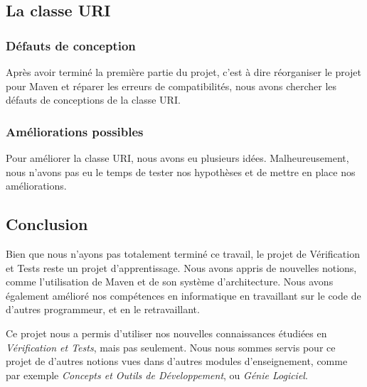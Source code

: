 \documentclass[a4paper]{article}
\begin{document}
	\vspace{0.5cm}

		\subsection{La classe URI}

		\vspace{0.5cm}

			\subsubsection{Défauts de conception}

			Après avoir terminé la première partie du projet, c'est à dire réorganiser le projet pour Maven et réparer les erreurs de compatibilités, nous avons chercher les défauts de conceptions de la classe URI.  

			\vspace{0.5cm}

			\subsubsection{Améliorations possibles}

			Pour améliorer la classe URI, nous avons eu plusieurs idées. Malheureusement, nous n'avons pas eu le temps de tester nos hypothèses et de mettre en place nos améliorations.

			\newpage

	\begin{center}
		\section{Conclusion}
	\end{center}	
		Bien que nous n'ayons pas totalement terminé ce travail, le projet de Vérification et Tests reste un projet d'apprentissage. Nous avons appris de nouvelles notions, comme l'utilisation de Maven et de son système d'architecture. Nous avons également amélioré nos compétences en informatique en travaillant sur le code de d'autres programmeur, et en le retravaillant.

		Ce projet nous a permis d'utiliser nos nouvelles connaissances étudiées en \textit{Vérification et Tests}, mais pas seulement. Nous nous sommes servis pour ce projet de d'autres notions vues dans d'autres modules d'enseignement, comme par exemple \textit{Concepts et Outils de Développement}, ou \textit{Génie Logiciel}.
 
\end{document}
